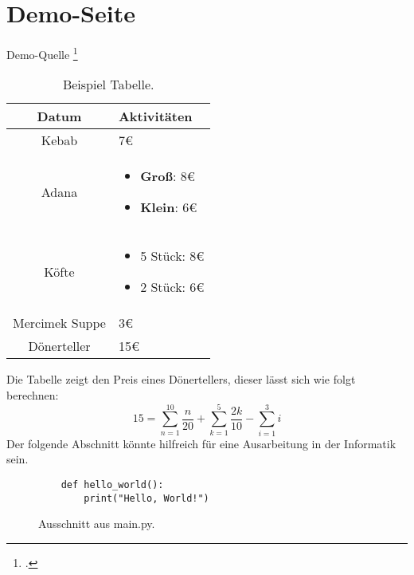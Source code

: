 \section{Demo-Seite}
Demo-Quelle \footcite[Vgl.][]{DemoQuelle}

\begin{center}
    \begin{table}[h]
    \centering
    \begin{tabular}{|c|p{6cm}|}
        \hline
        \textbf{Datum} & \textbf{Aktivitäten} \\
        \hline
        Kebab & 7€ \\
        \hline
        Adana & \begin{itemize}
            \item \textbf{Groß}: 8€
            \item \textbf{Klein}: 6€
        \end{itemize} \\
        \hline
        Köfte & \begin{itemize}
            \item 5 Stück: 8€
            \item 2 Stück: 6€
        \end{itemize}\\
        \hline
        Mercimek Suppe & 3€ \\
        \hline
        Dönerteller & 15€ \\
        \hline
    \end{tabular}
    \caption{Beispiel Tabelle.}
    \label{tab:example}
    \end{table}
    \end{center}

Die Tabelle zeigt den Preis eines Dönertellers, dieser lässt sich wie folgt berechnen:
\begin{equation}
    15 = \sum_{n=1}^{10} \frac{n}{20} + \sum_{k=1}^{5} \frac{2k}{10} - \sum_{i=1}^{3} i
\end{equation}
\newpage
Der folgende Abschnitt könnte hilfreich für eine Ausarbeitung in der Informatik sein.
\begin{figure}[h]
\begin{lstlisting}
    def hello_world():
        print("Hello, World!")
\end{lstlisting}
\caption{Ausschnitt aus main.py.}
\label{fig:meincode}
\end{figure}